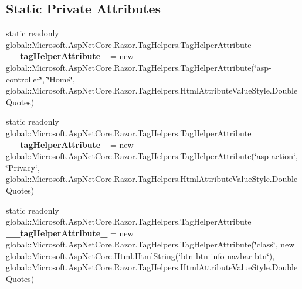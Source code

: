 \subsection*{Static Private Attributes}
\begin{DoxyCompactItemize}
\item 
\mbox{\label{class_asp_net_core_1_1_views___shared_____cookie_consent_partial_a61b37124d68515418393bf927053771e}} 
static readonly global\+::\+Microsoft.\+Asp\+Net\+Core.\+Razor.\+Tag\+Helpers.\+Tag\+Helper\+Attribute {\bfseries \+\_\+\+\_\+tag\+Helper\+Attribute\+\_} = new global\+::\+Microsoft.\+Asp\+Net\+Core.\+Razor.\+Tag\+Helpers.\+Tag\+Helper\+Attribute(\char`\"{}asp-\/controller\char`\"{}, \char`\"{}Home\char`\"{}, global\+::\+Microsoft.\+Asp\+Net\+Core.\+Razor.\+Tag\+Helpers.\+Html\+Attribute\+Value\+Style.\+Double\+Quotes)
\item 
\mbox{\label{class_asp_net_core_1_1_views___shared_____cookie_consent_partial_a5f5b5b93206f2e5993c35b6ad2e0ac7a}} 
static readonly global\+::\+Microsoft.\+Asp\+Net\+Core.\+Razor.\+Tag\+Helpers.\+Tag\+Helper\+Attribute {\bfseries \+\_\+\+\_\+tag\+Helper\+Attribute\+\_} = new global\+::\+Microsoft.\+Asp\+Net\+Core.\+Razor.\+Tag\+Helpers.\+Tag\+Helper\+Attribute(\char`\"{}asp-\/action\char`\"{}, \char`\"{}Privacy\char`\"{}, global\+::\+Microsoft.\+Asp\+Net\+Core.\+Razor.\+Tag\+Helpers.\+Html\+Attribute\+Value\+Style.\+Double\+Quotes)
\item 
\mbox{\label{class_asp_net_core_1_1_views___shared_____cookie_consent_partial_a8ef7b471aa7504e47231e27d22334b3c}} 
static readonly global\+::\+Microsoft.\+Asp\+Net\+Core.\+Razor.\+Tag\+Helpers.\+Tag\+Helper\+Attribute {\bfseries \+\_\+\+\_\+tag\+Helper\+Attribute\+\_} = new global\+::\+Microsoft.\+Asp\+Net\+Core.\+Razor.\+Tag\+Helpers.\+Tag\+Helper\+Attribute(\char`\"{}class\char`\"{}, new global\+::\+Microsoft.\+Asp\+Net\+Core.\+Html.\+Html\+String(\char`\"{}btn btn-\/info navbar-\/btn\char`\"{}), global\+::\+Microsoft.\+Asp\+Net\+Core.\+Razor.\+Tag\+Helpers.\+Html\+Attribute\+Value\+Style.\+Double\+Quotes)
\end{DoxyCompactItemize}


